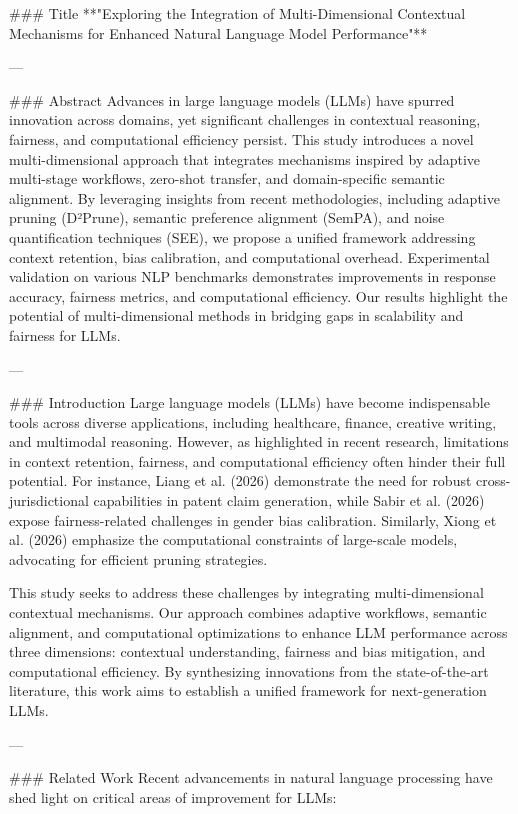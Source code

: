 ### Title  
**"Exploring the Integration of Multi-Dimensional Contextual Mechanisms for Enhanced Natural Language Model Performance"**

---

### Abstract  
Advances in large language models (LLMs) have spurred innovation across domains, yet significant challenges in contextual reasoning, fairness, and computational efficiency persist. This study introduces a novel multi-dimensional approach that integrates mechanisms inspired by adaptive multi-stage workflows, zero-shot transfer, and domain-specific semantic alignment. By leveraging insights from recent methodologies, including adaptive pruning (D²Prune), semantic preference alignment (SemPA), and noise quantification techniques (SEE), we propose a unified framework addressing context retention, bias calibration, and computational overhead. Experimental validation on various NLP benchmarks demonstrates improvements in response accuracy, fairness metrics, and computational efficiency. Our results highlight the potential of multi-dimensional methods in bridging gaps in scalability and fairness for LLMs.

---

### Introduction  
Large language models (LLMs) have become indispensable tools across diverse applications, including healthcare, finance, creative writing, and multimodal reasoning. However, as highlighted in recent research, limitations in context retention, fairness, and computational efficiency often hinder their full potential. For instance, Liang et al. (2026) demonstrate the need for robust cross-jurisdictional capabilities in patent claim generation, while Sabir et al. (2026) expose fairness-related challenges in gender bias calibration. Similarly, Xiong et al. (2026) emphasize the computational constraints of large-scale models, advocating for efficient pruning strategies.

This study seeks to address these challenges by integrating multi-dimensional contextual mechanisms. Our approach combines adaptive workflows, semantic alignment, and computational optimizations to enhance LLM performance across three dimensions: contextual understanding, fairness and bias mitigation, and computational efficiency. By synthesizing innovations from the state-of-the-art literature, this work aims to establish a unified framework for next-generation LLMs.

---

### Related Work  
Recent advancements in natural language processing have shed light on critical areas of improvement for LLMs:

